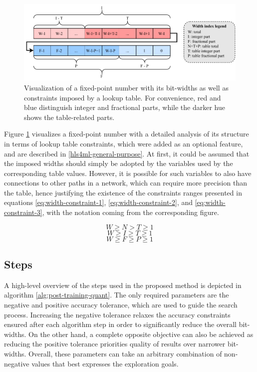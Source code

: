 \begin{figure}[hpt!]
  \centering
  \includegraphics[trim={0cm 0cm 0cm 0cm}, width=1.0\textwidth, center]{quantization/width_constraints.pdf}
  \caption{Visualization of a fixed-point number with its bit-widths as well as constraints imposed by a lookup table. For convenience, red and blue distinguish integer and fractional parts, while the darker hue shows the table-related parts.}
  \label{fig:width-constraints}
\end{figure}

Figure \ref{fig:width-constraints} visualizes a fixed-point number with a detailed analysis of its structure in terms of lookup table constraints, which were added as an optional feature, and are described in \cref{hls4ml-general-purpose}. At first, it could be assumed that the imposed widths should simply be adopted by the variables used by the corresponding table values. However, it is possible for such variables to also have connections to other paths in a network, which can require more precision than the table, hence justifying the existence of the constraints ranges presented in equations \ref{eq:width-constraint-1}, \ref{eq:width-constraint-2}, and \ref{eq:width-constraint-3}, with the notation coming from the corresponding figure.

\begin{equation} \label{eq:width-constraint-1}
  W \geqslant N > T \geqslant 1
\end{equation}
\begin{equation} \label{eq:width-constraint-2}
  W \geqslant I \geqslant T \geqslant 1
\end{equation}
\begin{equation} \label{eq:width-constraint-3}
  W \geqslant F \geqslant P \geqslant 1
\end{equation}

\subsection{Steps}
A high-level overview of the steps used in the proposed method is depicted in algorithm \ref{alg:post-training-quant}. The only required parameters are the negative and positive accuracy tolerance, which are used to guide the search process. Increasing the negative tolerance relaxes the accuracy constraints ensured after each algorithm step in order to significantly reduce the overall bit-widths. On the other hand, a complete opposite objective can also be achieved as reducing the positive tolerance priorities quality of results over narrower bit-widths. Overall, these parameters can take an arbitrary combination of non-negative values that best expresses the exploration goals.

